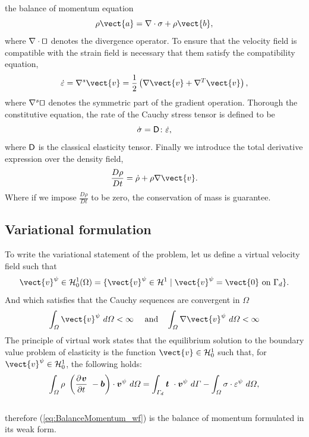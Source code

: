 the balance of momentum equation
\begin{equation}
  \label{eq:Balance-momentum}
\rho \vect{a} = \Div{\tens{\sigma}} + \rho \vect{b},
\end{equation}
where $\Div{\qed}$ denotes the divergence operator. To ensure that the
velocity field is compatible with the strain field is necessary that
them satisfy the compatibility equation,
\begin{equation}
  \label{eq:Compatibility-equation}
  \dot{\tens{\varepsilon}} = \GradS{\vect{v}} = \frac{1}{2}\left(
    \Grad{\vect{v}} +  \GradT{\vect{v}} \right),
\end{equation}
where $\GradS{\qed}$ denotes the symmetric part of the gradient
operation. Thorough the constitutive equation, the rate of the Cauchy stress
tensor is defined to be
\begin{equation}
  \label{eq:Constitutive-equation}
\dot{\mathsf{\sigma}} = \mathsf{D} \colon \dot{\mathsf{\varepsilon}},
\end{equation}
where $\mathsf{D}$ is the classical elasticity tensor. Finally we
introduce the total derivative expression over the density field,
\begin{equation}
  \label{eq:Rho-material-derivative}
\frac{D \rho}{D t} = \dot{\rho} + \rho \Grad{\vect{v}}.
\end{equation}
Where if we impose $\frac{D \rho}{D t}$ to be zero, the conservation
of mass is guarantee.

\subsection{Variational formulation}
\label{sec:variational-formulation}
To write the variational statement of the problem, let us define a
virtual velocity field such that
\begin{equation}
  \label{eq:Hilbert-space}
  \vect{v}^{\psi} \in \mathcal{H}^1_0(\Omega) = \{ \vect{v}^{\psi} \in
  \mathcal{H}^1 \mid \vect{v}^{\psi} = \vect{0}\ \text{on}\ \Gamma_d \}.
\end{equation}
And which satisfies that the Cauchy sequences are convergent in $\varOmega$
\begin{equation}
  \label{eq:cauchy-secuence}
  \Integral{3}{\vect{v}^{\psi}} < \infty\ \quad\text{and}\quad \Integral{3}{\Grad{\vect{v}^{\psi}}} < \infty
\end{equation}
The principle of virtual work states that the equilibrium solution to
the boundary value problem of elasticity is the function $\vect{v} \in
\mathcal{H}^1_0$ such that, for $\vect{v}^{\psi} \in
\mathcal{H}^1_0$, the following holds:
\begin{equation}
  \label{eq:BalanceMomentum_wf}
  \Integral{3}{\rho\ \left( \Deriv{\vec{v}}{t}\ - \vec{b} \right) \cdot \vec{v}^{\psi}} =
  \Integral{2}{\vec{t}\ \cdot \vec{v}^{\psi}} - \Integral{3}{\tens{\sigma} \cdot
    \tens{\varepsilon}^{\psi}},
\end{equation}\\
therefore (\ref{eq:BalanceMomentum_wf}) is the balance of momentum formulated in
its weak form.

